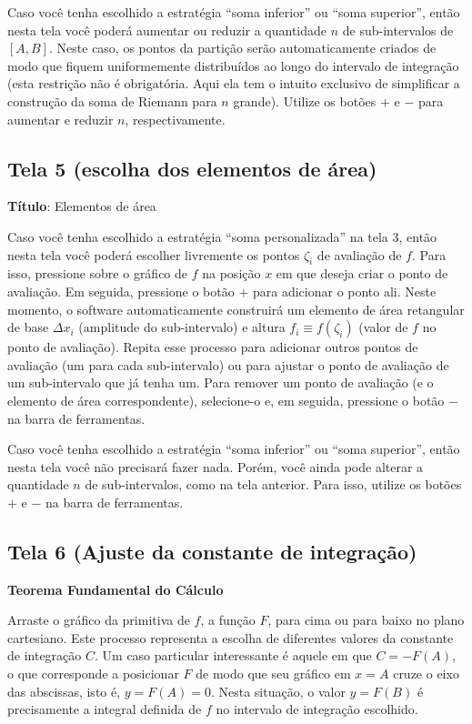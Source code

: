 \documentclass[a4paper,10pt]{scrartcl}
\begin{document}
    Caso você tenha escolhido a estratégia ``soma inferior'' ou ``soma superior'', então nesta tela você poderá aumentar ou reduzir a quantidade $n$ de sub-intervalos de $[A,B]$. Neste caso, os pontos da partição serão automaticamente criados de modo que fiquem uniformemente distribuídos ao longo do intervalo de integração (esta restrição não é obrigatória. Aqui ela tem o intuito exclusivo de simplificar a construção da soma de Riemann para $n$ grande). Utilize os botões $+$ e $-$ para aumentar e reduzir $n$, respectivamente.

  \subsection*{Tela 5 (escolha dos elementos de área)}
    \textbf{Título}: Elementos de área
    
    Caso você tenha escolhido a estratégia ``soma personalizada'' na tela 3, então nesta tela você poderá escolher livremente os pontos $\zeta_i$ de avaliação de $f$. Para isso, pressione sobre o gráfico de $f$ na posição $x$ em que deseja criar o ponto de avaliação. Em seguida, pressione o botão $+$ para adicionar o ponto ali. Neste momento, o software automaticamente construirá um elemento de área retangular de base $\Delta x_i$ (amplitude do sub-intervalo) e altura $f_i \equiv f(\zeta_i)$ (valor de $f$ no ponto de avaliação). Repita esse processo para adicionar outros pontos de avaliação (um para cada sub-intervalo) ou para ajustar o ponto de avaliação de um sub-intervalo que já tenha um. Para remover um ponto de avaliação (e o elemento de área correspondente), selecione-o e, em seguida, pressione o botão $-$ na barra de ferramentas.
    
    Caso você tenha escolhido a estratégia ``soma inferior'' ou ``soma superior'', então nesta tela você não precisará fazer nada. Porém, você ainda pode alterar a quantidade $n$ de sub-intervalos, como na tela anterior. Para isso, utilize os botões $+$ e $-$ na barra de ferramentas.

  \subsection*{Tela 6 (Ajuste da constante de integração)}
    \textbf{Teorema Fundamental do Cálculo}
    
    Arraste o gráfico da primitiva de $f$, a função $F$, para cima ou para baixo no plano cartesiano. Este processo representa a escolha de diferentes valores da constante de integração $C$. Um caso particular interessante é aquele em que $C = -F(A)$, o que corresponde a posicionar $F$ de modo que seu gráfico em $x = A$ cruze o eixo das abscissas, isto é, $y = F(A) = 0$. Nesta situação, o valor $y = F(B)$ é precisamente a integral definida de $f$ no intervalo de integração escolhido.
    
\end{document}
